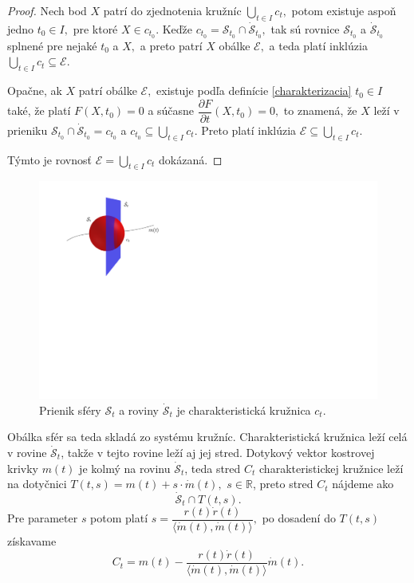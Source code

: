 \begin{proof}
Nech bod $X$ patrí do zjednotenia kružníc $ \bigcup_{t \in I} c_{t}, $ potom existuje aspoň jedno $t_0 \in I, $ pre ktoré $X \in c_{t_0}.$ Keďže $c_{t_0} = \mathcal{S}_{t_0} \cap \mathcal{\dot{S}}_{t_0}, $ tak sú rovnice $\mathcal{S}_{t_0} $ a $ \mathcal{\dot{S}}_{t_0}$ splnené pre nejaké $t_0$ a $X,$ a preto patrí $X$ obálke $\mathcal{E}, $ a teda platí inklúzia $\bigcup_{t \in I} c_{t} \subseteq \mathcal{E}. $

Opačne, ak $X$ patrí obálke $\mathcal{E},$ existuje podľa definície \ref{charakterizacia} $t_0 \in I $ také, že platí $F(X,t_0) = 0$ a súčasne $\dfrac{\partial F}{\partial t}(X, t_0)=0,$ to znamená, že $X$ leží v prieniku $\mathcal{S}_{t_0} \cap \mathcal{\dot{S}}_{t_0} = c_{t_0} $ a $c_{t_0} \subseteq \bigcup_{t \in I} c_t. $ Preto platí inklúzia $\mathcal{E} \subseteq \bigcup_{t \in I} c_t.$ 

Týmto je rovnosť $\mathcal{E} = \bigcup_{t \in I} c_t$ dokázaná.
\end{proof}

\begin{figure}[h]
	\centering
	\includegraphics[trim={-1cm 11cm 0 1cm},clip]{images/char_kruznica.pdf}
	\caption[Charakteristická kružnica.]{Prienik sféry $\mathcal{S}_t$ a roviny $\mathcal{\dot{S}}_t$ je charakteristická kružnica $c_t$.}
	\label{fig:char_kruznica}
\end{figure}

Obálka sfér sa teda skladá zo systému kružníc. Charakteristická kružnica leží celá v rovine $\mathcal{\dot{S}}_t $, takže v tejto rovine leží aj jej stred. Dotykový vektor kostrovej krivky $m(t)$ je kolmý na rovinu $\mathcal{\dot{S}}_t$, teda stred $C_t$ charakteristickej kružnice leží na dotyčnici $T(t, s)= m(t) + s \cdot \dot{m}(t),$ $s \in \mathbb{R}$, preto stred $C_t$ nájdeme ako
$$ \mathcal{\dot{S}}_t \cap T(t, s).$$
Pre parameter $s$ potom platí $s = \dfrac{r(t) \dot{r}(t)}{\langle \dot{m}(t), \dot{m}(t) \rangle }, $
po dosadení do $T(t, s)$ získavame
\begin{equation}
\label{eq:stred charakteristickej kruznice}
C_t = m(t) - \frac{r(t) \dot{r}(t)}{\langle \dot{m}(t), \dot{m}(t) \rangle} \dot{m}(t).
\end{equation}


